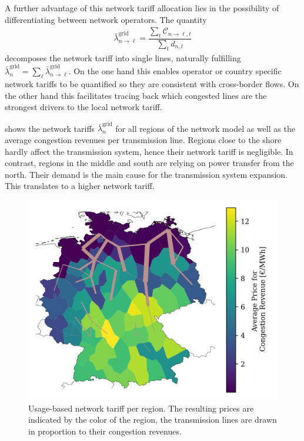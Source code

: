 \documentclass[11pt,twocolumn]{article}
\newcommand{\averagelmp}[1][n]{\bar{\lambda}_{#1}}
\newcommand{\demand}[1][n]{d_{#1,t}}
\newcommand{\cost}{\mathcal{C}}
\newcommand{\allocatelinecost}[1][n \rightarrow \ell]{\cost_{#1, t}}
\begin{document}
A further advantage of this network tariff allocation lies in the possibility of differentiating between network operators. The quantity
\begin{align}
    \averagelmp[n\rightarrow \ell]^\text{grid} = \dfrac{\sum_{t} \allocatelinecost}{\sum_t \demand}
\end{align}
decomposes the network tariff into single lines, naturally fulfilling  $\averagelmp^\text{grid} = \sum_\ell \averagelmp[n\rightarrow \ell]^\text{grid}$. On the one hand this enables operator or country specific network tariffs to be quantified so they are consistent with cross-border flows. On the other hand this facilitates tracing back which congested lines are the strongest drivers to the local network tariff.

 shows the network tariffs $\averagelmp[n]^\text{grid}$ for all regions of the network model as well as the average congestion revenues per transmission line. Regions close to the shore hardly affect the transmission system, hence their network tariff is negligible. In contrast, regions in the middle and south are relying on power transfer from the north. Their demand is the main cause for the transmission system expansion. This translates to a higher network tariff.

\begin{figure}
    \includegraphics[width=\linewidth]{de50/maps_price/branch_investment_cost.png}
    \caption{Usage-based network tariff per region. The resulting prices are indicated by the color of the region, the transmission lines are drawn in proportion to their congestion revenues.}
    \label{fig:congestion_revenue}
\end{figure}
\end{document}
